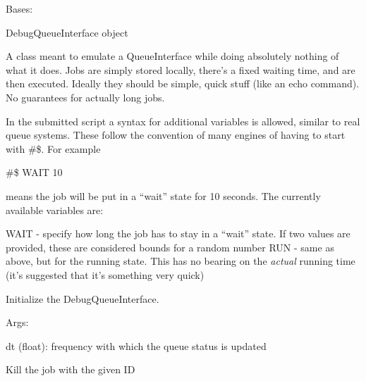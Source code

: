 \documentclass[letterpaper,10pt,english]{sphinxmanual}
\begin{document}
\begin{fulllineitems}
\label{doctree/soprano.hpc.submitter.debug.debugqueue:soprano.hpc.submitter.debug.debugqueue.DebugQueueInterface}
Bases: {\hyperref[doctree/soprano.hpc.submitter.queues:soprano.hpc.submitter.queues.QueueInterface]{\emph{}}}

DebugQueueInterface object

A class meant to emulate a QueueInterface while doing absolutely nothing
of what it does. Jobs are simply stored locally, there's a fixed waiting
time, and are then executed. Ideally they should be simple, quick stuff
(like an echo command). No guarantees for actually long jobs.

In the submitted script a syntax for additional variables is allowed,
similar to real queue systems. These follow the convention of many engines
of having to start with \#\$. For example

\#\$ WAIT 10

means the job will be put in a ``wait'' state for 10 seconds. The currently
available variables are:

WAIT - specify how long the job has to stay in a ``wait'' state. If two
values are provided, these are considered bounds for a random number
RUN - same as above, but for the running state. This has no bearing on the
\emph{actual} running time (it's suggested that it's something very quick)

Initialize the DebugQueueInterface.

\begin{DUlineblock}{0em}
\item[] Args:
\item[]
\begin{DUlineblock}{\DUlineblockindent}
\item[] dt (float): frequency with which the queue status is updated
\end{DUlineblock}
\end{DUlineblock}

\begin{fulllineitems}
\label{doctree/soprano.hpc.submitter.debug.debugqueue:soprano.hpc.submitter.debug.debugqueue.DebugQueueInterface.kill}
Kill the job with the given ID


\end{fulllineitems}
\end{fulllineitems}
\end{document}
